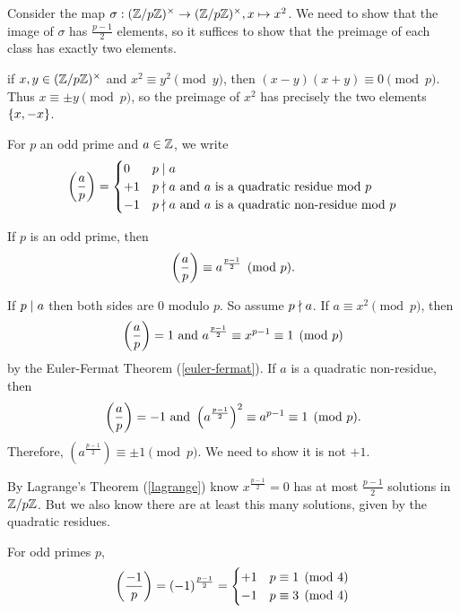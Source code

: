 \documentclass{article}
\begin{document}
\begin{prf}
    Consider the map $\sigma : (\mathbb{Z}/p\mathbb{Z})^\times \to (\mathbb{Z}/p\mathbb{Z})^\times, x \mapsto x^2$. We need to show that the image of $\sigma$ has $\frac{p-1}{2}$ elements, so it suffices to show that the preimage of each class has exactly two elements.
    
    if $x, y \in (\mathbb{Z}/p\mathbb{Z})^\times$ and $x^2 \equiv y^2 \pmod{y}$, then $(x-y)(x+y) \equiv 0 \pmod{p}$. Thus $x \equiv \pm y \pmod{p}$, so the preimage of $x^2$ has precisely the two elements $\left\lbrace x, -x \right\rbrace$.
\end{prf}

\begin{definition}
    For $p$ an odd prime and $a \in \mathbb{Z}$, we write
    \[
	\left( \frac{a}{p} \right) =
	\begin{cases}
		0 & p \mid a \\
		+1 & p \nmid a \text{ and $a$ is a quadratic residue mod $p$} \\
		-1 & p \nmid a \text{ and $a$ is a quadratic non-residue mod $p$}
		\end{cases}
	\]
\end{definition}

\begin{proposition}
	\label{eulers-criterion}
    If $p$ is an odd prime, then
    \[
	\left( \frac{a}{p} \right) \equiv a^\frac{p-1}{2} \pmod{p}.
	\]
\end{proposition}

\begin{prf}
    If $p \mid a$ then both sides are 0 modulo $p$. So assume $p \nmid a$.
    If $a \equiv x^2 \pmod{p}$, then
    \[
	\left( \frac{a}{p} \right) = 1
	\text{ and }
	a^\frac{p-1}{2} \equiv x^{p-1} \equiv 1 \pmod{p}
	\]
	by the Euler-Fermat Theorem (\ref{euler-fermat}).
	If $a$ is a quadratic non-residue, then
	\[
	\left( \frac{a}{p} \right) = -1
	\text{ and }
	\left(a^\frac{p-1}{2}\right)^2 \equiv a^{p-1} \equiv 1 \pmod{p}.
	\]
	Therefore, $\left(a^\frac{p-1}{2}\right) \equiv \pm 1 \pmod{p}$. We need to show it is not $+1$.
	
	By Lagrange's Theorem (\ref{lagrange}) know $x^{\frac{p-1}{2}} = 0$ has at most $\frac{p-1}{2}$ solutions in $\mathbb{Z}/p\mathbb{Z}$. But we also know there are at least this many solutions, given by the quadratic residues.
\end{prf}

\begin{corollary}
    For odd primes $p$,
    \[
    \left( \frac{-1}{p} \right) = (-1)^\frac{p-1}{2} = \begin{cases}
    	+1 & p \equiv 1 \pmod{4} \\
    	-1 & p \equiv 3 \pmod{4}
    \end{cases}
    \]
\end{corollary}
\end{document}
